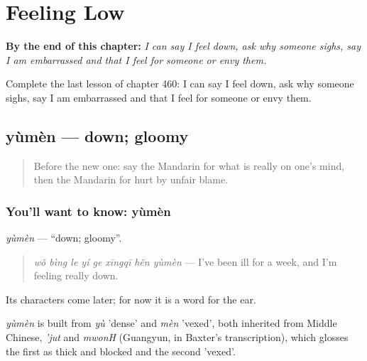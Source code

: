 
\chapter{Feeling Low}
\label{ch:zh-feeling-low}

\begin{chapteropening}
\textbf{By the end of this chapter:} \emph{I can say I feel down, ask why someone sighs, say I am embarrassed and that I feel for someone or envy them.}

Complete the last lesson of chapter 460: I can say I feel down, ask why someone sighs, say I am embarrassed and that I feel for someone or envy them.
\end{chapteropening}

\section[yùmèn]{yùmèn — down; gloomy}

\label{lesson:ZH-C460-yumen}



\begin{quote}
Before the new one: say the Mandarin for what is really on one's mind, then the Mandarin for hurt by unfair blame.
\end{quote}

\subsection*{You'll want to know: yùmèn}
\emph{yùmèn} — \textquotedblleft{}down; gloomy\textquotedblright{}.

\begin{quote}
\emph{wǒ bìng le yí ge xīngqī hěn yùmèn} — I've been ill for a week, and I'm feeling really down.
\end{quote}

Its characters come later; for now it is a word for the ear.

\begin{cousinweb}
\emph{yùmèn} is built from \emph{yù} 'dense' and \emph{mèn} 'vexed', both inherited from Middle Chinese, \emph{'jut} and \emph{mwonH} (Guangyun, in Baxter's transcription), which glosses the first as thick and blocked and the second 'vexed'.
\end{cousinweb}

